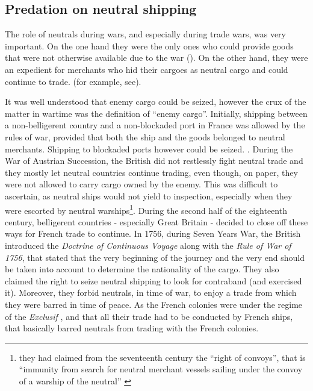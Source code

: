 \documentclass[12pt,a4paper,notitlepage,english]{article}
\begin{document}
\subsection{Predation on neutral shipping}

The role of neutrals during wars, and especially during trade wars, was very important. On the one hand they were the only ones who could provide goods that were not otherwise available due to the war (\cite{Hedberg2015}). On the other hand, they were an expedient for merchants who hid their cargoes as neutral cargo and could continue to trade. (for example, see\cite{Carriere1973,Schnakenbourg2013,Schnakenbourg2015}). 

It was well understood that enemy cargo could be seized, however the crux of the matter in wartime was the definition of ``enemy cargo''. 
Initially, shipping between a non-belligerent country and a non-blockaded port in France was allowed by the rules of war, provided that both the ship and the goods belonged to neutral merchants. Shipping to blockaded ports however could be seized. \citep[p. 112]{Schnakenbourg2013}.
During the War of Austrian Succession, the British did not restlessly fight neutral trade and they mostly let neutral countries continue trading, even though, on paper, they were not allowed to carry cargo owned by the enemy. This was difficult to ascertain, as neutral ships would not yield to inspection, especially when they were escorted by neutral warships\footnote{they had claimed from the seventeenth century the ``right of convoys'', that is ``immunity from search for neutral merchant vessels sailing under the convoy of a warship of the neutral''  \citep{TheEditorsofEncyclopaediaBritannica2014}}.
During the second half of the eighteenth century, belligerent countries - especially Great Britain - decided to close off these ways for French trade to continue. 
In 1756, during Seven Years War, the British introduced the \textit{Doctrine of Continuous Voyage} along with the \textit{Rule of War of 1756}, that stated that the very beginning of the journey and the very end should be taken into account to determine the nationality of the cargo.
They also claimed the right to seize neutral shipping to look for contraband (and exercised it).
Moreover, they forbid neutrals, in time of war, to enjoy a trade from which they were barred in time of peace. As the French colonies were under the regime of the \textit{Exclusif} \citep{Tarrade1972}, and that all their trade had to be conducted by French ships, that basically barred neutrals from trading with the French colonies.
\end{document}
